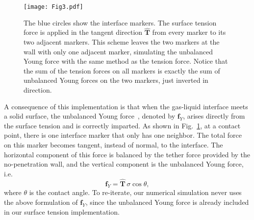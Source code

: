 \documentclass[%
 aip,
 amsmath,amssymb,
 reprint,
 floatfix
]{revtex4-1}
\begin{document}
\begin{figure}
    \centering
    \texttt{[image: Fig3.pdf]}
    \caption{\footnotesize{
        The blue circles show the interface markers. The surface tension force is applied in the tangent direction $\bm{\hat{T}}$ from every marker to its two adjacent markers. This scheme leaves the two markers at the wall with only one adjacent marker, simulating the unbalanced Young force with the same method as the tension force. Notice that the sum of the tension forces on all markers is exactly the sum of unbalanced Young forces on the two markers, just inverted in direction.}}
    \label{fig:young1}
\end{figure}

A consequence of this implementation is that when the gas-liquid interface meets a solid surface, the unbalanced Young force~\cite{quian2003generalized}, denoted by $\bm{f}_Y$, arises directly from the surface tension and is correctly imparted. As shown in Fig.~\ref{fig:young1}, at a contact point, there is one interface marker that only has one neighbor. The total force on this marker becomes tangent, instead of normal, to the interface. The horizontal component of this force is balanced by the tether force provided by the no-penetration wall, and the vertical component is the unbalanced Young force, i.e.
\begin{equation}
    \bm{f}_Y = \bm{\hat{T}} \, \sigma \cos\theta, \label{eq:young}
\end{equation}
where $\theta$ is the contact angle. To re-iterate, our numerical simulation never uses the above formulation of $\bm{f}_Y$, since the unbalanced Young force is already included in our surface tension implementation. 
\end{document}
